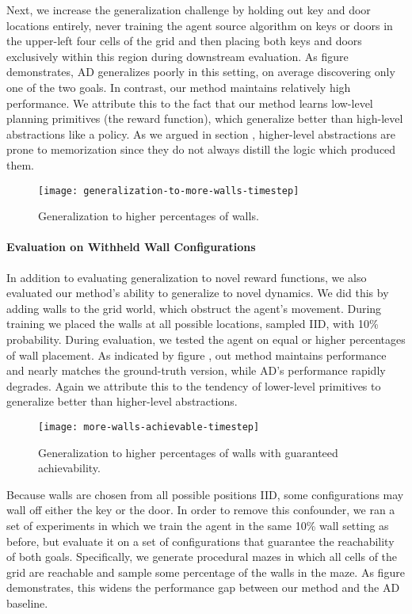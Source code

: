 Next, we increase the generalization challenge by holding out key and door
locations entirely, never training the agent source algorithm on keys or doors
in the upper-left four cells of the grid and then placing both keys and doors
exclusively within this region during downstream evaluation. As
figure  demonstrates, AD generalizes poorly in this setting,
on average discovering only one of the two goals. In contrast, our method
maintains relatively high performance. We attribute this to the fact that our
method learns low-level planning primitives (the reward function), which
generalize better than high-level abstractions like a policy. As we argued in
section , higher-level abstractions are prone to memorization
since they do not always distill the logic which produced them.


\begin{figure}
    \centering
    \texttt{[image: generalization-to-more-walls-timestep]}
    \caption{Generalization to higher percentages of walls.}
\end{figure}


\paragraph{Evaluation on Withheld Wall Configurations}
In addition to evaluating generalization to novel reward functions, we also
evaluated our method's ability to generalize to novel dynamics. We did this by
adding walls to the grid world, which obstruct the agent's movement. During
training we placed the walls at all possible locations, sampled IID, with 10\%
probability. During evaluation, we tested the agent on equal or higher
percentages of wall placement. As indicated by figure
, out method maintains performance and nearly matches
the ground-truth version, while AD's performance rapidly degrades. Again we
attribute this to the tendency of lower-level primitives to generalize better
than higher-level abstractions.

\begin{figure}[b]
    \centering
    \texttt{[image: more-walls-achievable-timestep]}
    \caption{Generalization to higher percentages of walls with guaranteed achievability.}
\end{figure}

Because walls are chosen from all possible positions IID, some configurations
may wall off either the key or the door. In order to remove this confounder, we
ran a set of experiments in which we train the agent in the same 10\% wall
setting as before, but evaluate it on a set of configurations that guarantee the
reachability of both goals. Specifically, we generate procedural mazes in which
all cells of the grid are reachable and sample some percentage of the walls in
the maze. As figure  demonstrates, this
widens the performance gap between our method and the AD baseline.

